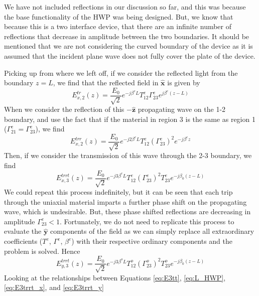 \documentclass{optica-article}
\newcommand{\bv}[1]{\mathbf{#1}}
\begin{document}
We have not included reflections in our discussion so far, and this was because
the base functionality of the HWP was being designed. But, we know that because
this is a two interface device, that there are an infinite number of
reflections that decrease in amplitude between the two boundaries. It should be
mentioned that we are not considering the curved boundary of the device as it 
is assumed that the incident plane wave does not fully cover the plate of the 
device.

Picking up from where we left off, if we consider the reflected light from the
boundary $z = L$, we find that the reflected field in $\bv{\hat{x}}$ is given by
\begin{equation}\label{eq:E2tr_x}
  E_{x,2}^{tr}(z) = \frac{E_0}{\sqrt{2}}e^{-j\beta^eL}
  T_{12}^e \Gamma_{23}^e e^{j\beta^e(z-L)}
\end{equation}
When we consider the reflection of this $-\bv{\hat{z}}$ propagating wave 
on the 1-2 boundary, and use the fact that if the material in region 3 is the 
same as region 1 ($\Gamma^e_{21} = \Gamma^e_{23}$), we find
\begin{equation}\label{eq:E2trr_x}
  E_{x,2}^{trr}(z) = \frac{E_0}{\sqrt{2}}e^{-j2\beta^eL}
  T_{12}^e \left(\Gamma_{23}^e\right)^2 e^{-j\beta^ez}
\end{equation}
Then, if we consider the transmission of this wave through the 2-3 boundary, we
find
\begin{equation}\label{eq:E3trrt_x}
  E_{x,3}^{trrt}(z) = \frac{E_0}{\sqrt{2}}e^{-j3\beta^eL}
  T_{12}^e \left(\Gamma_{23}^e\right)^2T_{23}^e e^{-j\beta_0 (z-L)}
\end{equation}
We could repeat this process indefinitely, but it can be seen that each trip
through the uniaxial material imparts a further phase shift on the propagating
wave, which is undesirable. But, these phase shifted reflections are decreasing
in amplitude $\Gamma^e_{23}<1$. Fortunately, we do not need to replicate this
process to evaluate the $\bv{\hat{y}}$ components of the field as we can simply
replace all extraordinary coefficients ($T^e$, $\Gamma^e$, $\beta^e$) with their
respective ordinary components and the problem is solved. Hence
\begin{equation}\label{eq:E3trrt_y}
  E_{y,3}^{trrt}(z) = \frac{E_0}{\sqrt{2}}e^{-j3\beta^oL}
  T_{12}^o \left(\Gamma_{23}^o\right)^2T_{23}^o e^{-j\beta_0 (z-L)}
\end{equation}
Looking at the relationships between Equations 
\eqref{eq:E3tt}, \eqref{eq:L_HWP}, \eqref{eq:E3trrt_x}, and \eqref{eq:E3trrt_y}
\end{document}
